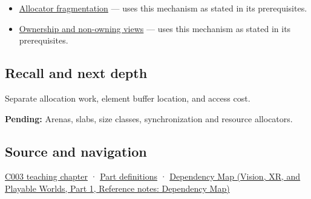 \hypertarget{appendix-c3480f7d9ff3-used-by}{}

\begin{itemize}
\tightlist
\item
  \hyperref[appendix-a7c50686d81f]{Allocator fragmentation} --- uses this mechanism as stated in its prerequisites.
\item
  \hyperref[appendix-d52e4486f527]{Ownership and non-owning views} --- uses this mechanism as stated in its prerequisites.
\end{itemize}

\subsection{Recall and next depth}\label{appendix-c3480f7d9ff3-recall-and-next-depth}

\hypertarget{appendix-c3480f7d9ff3-recall-and-next-depth}{}

Separate allocation work, element buffer location, and access cost.

\textbf{Pending:} Arenas, slabs, size classes, synchronization and resource allocators.

\subsection{Source and navigation}\label{appendix-c3480f7d9ff3-source-and-navigation}

\hypertarget{appendix-c3480f7d9ff3-source-and-navigation}{}

\hyperref[01-foundations-i-ch002-where-the-bytes-live]{C003 teaching chapter} · \hyperref[appendix-fd090d982a15-m003---parts-41-60]{Part definitions} · \href{../07-Vision-XR-and-Playable-Worlds-P01/main.pdf\#nameddest=appendix-4ad47bdd269a}{Dependency Map (Vision, XR, and Playable Worlds, Part 1, Reference notes: Dependency Map)}
